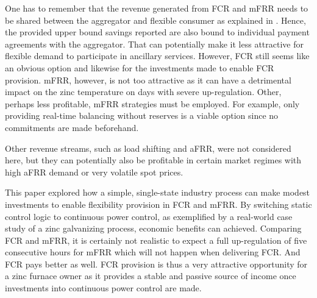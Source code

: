 \documentclass[lettersize,journal]{IEEEtran}
\begin{document}
One has to remember that the revenue generated from FCR and mFRR needs to be shared between the aggregator and flexible consumer as explained in \cite{gade2022ecosystem}. Hence, the provided upper bound savings reported are also bound to individual payment agreements with the aggregator. That can potentially make it less attractive for flexible demand to participate in ancillary services. However, FCR still seems like an obvious option and likewise for the investments made to enable FCR provision. mFRR, however, is not too attractive as it can have a detrimental impact on the zinc temperature on days with severe up-regulation. Other, perhaps less profitable, mFRR strategies must be employed. For example, only providing real-time balancing without reserves is a viable option since no commitments are made beforehand.

Other revenue streams, such as load shifting and aFRR, were not considered here, but they can potentially also be profitable in certain market regimes with high aFRR demand or very volatile spot prices.



This paper explored how a simple, single-state industry process can make modest investments to enable flexibility provision in FCR and mFRR. By switching static control logic to continuous power control, as exemplified by a real-world case study of a zinc galvanizing process, economic benefits can achieved. Comparing FCR and mFRR, it is certainly not realistic to expect a full up-regulation of five consecutive hours for mFRR which will not happen when delivering FCR. And FCR pays better as well. FCR provision is thus a very attractive opportunity for a zinc furnace owner as it provides a stable and passive source of income once investments into continuous power control are made.

% 





% 


\end{document}
